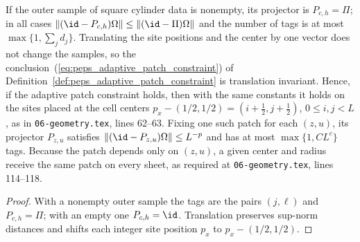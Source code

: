 \begin{lemma}
    \label{lem:peps_adaptive_patch_supply}
    \leanok
    If the outer sample of square cylinder data is nonempty, its projector is
    $P_{c,h}=\Pi$; in all cases
    $\lVert(\id-P_{c,h})\Omega\rVert\le\lVert(\id-\Pi)\Omega\rVert$ and the
    number of tags is at most $\max\{1,\sum_jd_j\}$. Translating the site
    positions and the center by one vector does not change the samples, so the
    conclusion~(\ref{eq:peps_adaptive_patch_constraint}) of Definition~\ref{def:peps_adaptive_patch_constraint} is translation invariant. Hence,
    if the adaptive patch constraint holds, then with the same constants it holds
    on the sites placed at the cell centers $p_x-(1/2,1/2)=(i+\tfrac12,j+\tfrac12)$,
    $0\le i,j<L$, as in \texttt{06-geometry.tex}, lines 62--63. Fixing one
    such patch for each $(z,u)$, its projector $P_{z,u}$ satisfies
    $\lVert(\id-P_{z,u})\Omega\rVert\le L^{-p}$ and has at most $\max\{1,CL^c\}$
    tags. Because the patch depends only on $(z,u)$, a given center
    and radius receive the same patch on every sheet, as required at
    \texttt{06-geometry.tex}, lines 114--118.
\end{lemma}

\begin{proof}\leanok
    With a nonempty outer sample the tags are the pairs $(j,\ell)$ and $P_{c,h}=\Pi$; with an
    empty one $P_{c,h}=\id$. Translation preserves sup-norm
    distances and shifts each integer site position $p_x$ to $p_x-(1/2,1/2)$.
\end{proof}

